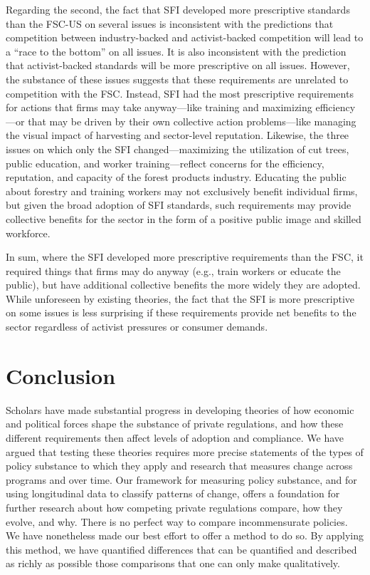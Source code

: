 \documentclass[
      12pt,
            Review ]{article}
\begin{document}
Regarding the second, the fact that SFI developed more prescriptive
standards than the FSC-US on several issues is inconsistent with the
predictions that competition between industry-backed and activist-backed
competition will lead to a ``race to the bottom'' on all issues. It is
also inconsistent with the prediction that activist-backed standards
will be more prescriptive on all issues. However, the substance of these
issues suggests that these requirements are unrelated to competition
with the FSC. Instead, SFI had the most prescriptive requirements for
actions that firms may take anyway---like training and maximizing
efficiency---or that may be driven by their own collective action
problems---like managing the visual impact of harvesting and
sector-level reputation. Likewise, the three issues on which only the
SFI changed---maximizing the utilization of cut trees, public education,
and worker training---reflect concerns for the efficiency, reputation,
and capacity of the forest products industry. Educating the public about
forestry and training workers may not exclusively benefit individual
firms, but given the broad adoption of SFI standards, such requirements
may provide collective benefits for the sector in the form of a positive
public image and skilled workforce.

In sum, where the SFI developed more prescriptive requirements than the
FSC, it required things that firms may do anyway (e.g., train workers or
educate the public), but have additional collective benefits the more
widely they are adopted. While unforeseen by existing theories, the fact
that the SFI is more prescriptive on some issues is less surprising if
these requirements provide net benefits to the sector regardless of
activist pressures or consumer demands.

\section{Conclusion}\label{conclusion}

Scholars have made substantial progress in developing theories of how
economic and political forces shape the substance of private
regulations, and how these different requirements then affect levels of
adoption and compliance. We have argued that testing these theories
requires more precise statements of the types of policy substance to
which they apply and research that measures change across programs and
over time. Our framework for measuring policy substance, and for using
longitudinal data to classify patterns of change, offers a foundation
for further research about how competing private regulations compare,
how they evolve, and why. There is no perfect way to compare
incommensurate policies. We have nonetheless made our best effort to
offer a method to do so. By applying this method, we have quantified
differences that can be quantified and described as richly as possible
those comparisons that one can only make qualitatively.
\end{document}
